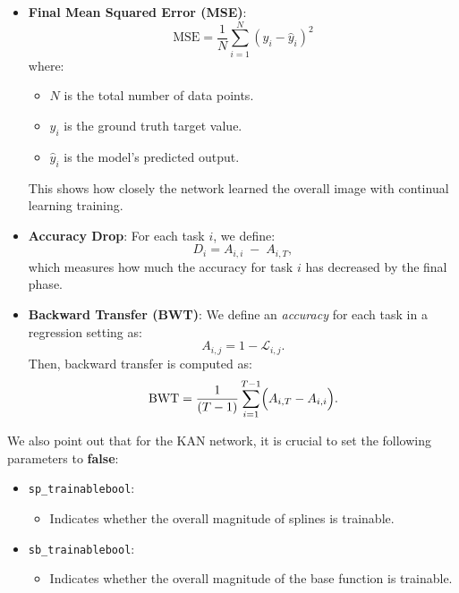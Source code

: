 \documentclass[conference]{IEEEtran}
\begin{document}
\begin{itemize}
    \item \textbf{Final Mean Squared Error (MSE)}:
          \begin{equation}
              \text{MSE} = \frac{1}{N} \sum_{i=1}^{N} (y_i - \hat{y}_i)^2
          \end{equation}
          where:
          \begin{itemize}
              \item \( N \) is the total number of data points.
              \item \( y_i \) is the ground truth target value.
              \item \( \hat{y}_i \) is the model’s predicted output.
          \end{itemize}
          This shows how closely the network learned the overall image with continual learning training.

    \item \textbf{Accuracy Drop}: For each task \(i\), we define:
          \begin{equation}
              D_i = A_{i,i} \;-\; A_{i,T},
          \end{equation}
          which measures how much the accuracy for task \(i\) has decreased by the final phase.

    \item \textbf{Backward Transfer (BWT)}:
          We define an \emph{accuracy} for each task in a regression setting as:
          \begin{equation}
              A_{i,j} = 1 - \mathcal{L}_{i,j}.
          \end{equation}
          Then, backward transfer is computed as:
          \begin{equation}
              \text{BWT} = \frac{1}{(T-1)} \sum_{i=1}^{T-1} \Bigl(A_{i,T} - A_{i,i}\Bigr).
          \end{equation}
\end{itemize}

We also point out that for the KAN network, it is crucial to set the following
parameters to \textbf{false}:

\begin{itemize}
    \item \texttt{sp\_trainablebool}:
          \begin{itemize}
              \item Indicates whether the overall magnitude of splines is trainable.
          \end{itemize}
    \item \texttt{sb\_trainablebool}:
          \begin{itemize}
              \item Indicates whether the overall magnitude of the base function is trainable.
          \end{itemize}
\end{itemize}
\end{document}
